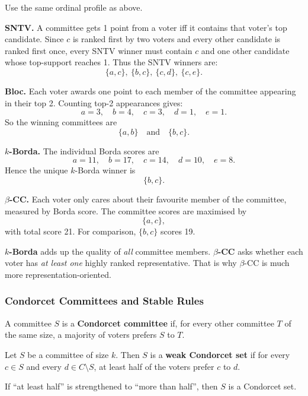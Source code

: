 \begin{exbox}[Worked Example: Committee Scoring Rules for $k=2$]
Use the same ordinal profile as above.

\textbf{SNTV.} A committee gets 1 point from a voter iff it contains that voter's top candidate. Since $c$ is ranked first by two voters and every other candidate is ranked first once, every SNTV winner must contain $c$ and one other candidate whose top-support reaches 1. Thus the SNTV winners are:
\[
  \{a,c\},\ \{b,c\},\ \{c,d\},\ \{c,e\}.
\]

\textbf{Bloc.} Each voter awards one point to each member of the committee appearing in their top 2. Counting top-2 appearances gives:
\[
  a=3,\quad b=4,\quad c=3,\quad d=1,\quad e=1.
\]
So the winning committees are
\[
  \{a,b\}\quad \text{and}\quad \{b,c\}.
\]

\textbf{$k$-Borda.} The individual Borda scores are
\[
  a=11,\quad b=17,\quad c=14,\quad d=10,\quad e=8.
\]
Hence the unique $k$-Borda winner is
\[
  \{b,c\}.
\]

\textbf{$\beta$-CC.} Each voter only cares about their favourite member of the committee, measured by Borda score. The committee scores are maximised by
\[
  \{a,c\},
\]
with total score 21. For comparison, $\{b,c\}$ scores 19.
\end{exbox}

\begin{tipbox}
\textbf{$k$-Borda} adds up the quality of \emph{all} committee members. \textbf{$\beta$-CC} asks whether each voter has \emph{at least one} highly ranked representative. That is why $\beta$-CC is much more representation-oriented.
\end{tipbox}

\separator

\subsubsection{Condorcet Committees and Stable Rules}

\begin{defbox}
A committee $S$ is a \textbf{Condorcet committee} if, for every other committee $T$ of the same size, a majority of voters prefers $S$ to $T$.
\end{defbox}

\begin{defbox}
Let $S$ be a committee of size $k$. Then $S$ is a \textbf{weak Condorcet set} if for every $c\in S$ and every $d\in C\setminus S$, at least half of the voters prefer $c$ to $d$.

If ``at least half'' is strengthened to ``more than half'', then $S$ is a Condorcet set.
\end{defbox}

